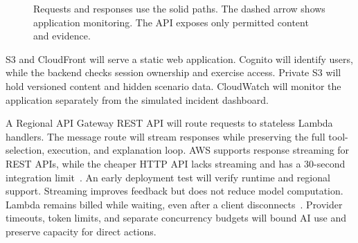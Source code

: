 \documentclass[11pt,a4paper]{article}
\begin{document}
\begin{figure}[ht]
\centering
{}
\caption{Requests and responses use the solid paths. The dashed arrow shows
application monitoring. The API exposes only permitted content and evidence.}
\label{fig:cloud}
\end{figure}

S3 and CloudFront will serve a static web application. Cognito will identify
users, while the backend checks session ownership and exercise access.
Private S3 will hold versioned content and hidden scenario data. CloudWatch
will monitor the application separately from the simulated incident dashboard.

A Regional API Gateway REST API will route requests to stateless Lambda
handlers. The message route will stream responses while preserving the full
tool-selection, execution, and explanation loop. AWS supports response
streaming for REST APIs, while the cheaper HTTP API lacks streaming and has a
30-second integration limit~\cite{aws-api}. An early deployment test will
verify runtime and regional support. Streaming improves feedback but does
not reduce model computation. Lambda remains billed while waiting, even
after a client disconnects~\cite{aws-streaming}. Provider timeouts, token
limits, and separate concurrency budgets will bound AI use and preserve
capacity for direct actions.
\end{document}
